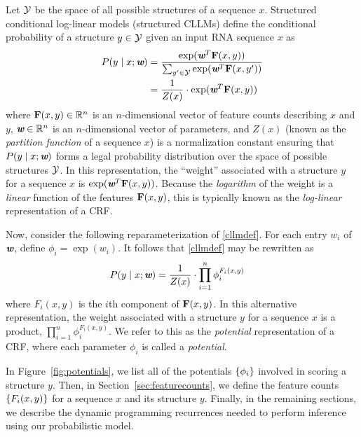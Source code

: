 \documentclass{article}
\begin{document}
  Let ${\mathcal{Y}}$ be the space of all possible structures of a sequence $x$.  
  Structured conditional log-linear models (structured CLLMs) define the 
  conditional probability of a structure $y \in {\mathcal{Y}}$ given an input RNA sequence $x$ as
  \begin{align}
    P(y \mid x; {\textbf{\em w}}) &= \frac{\exp ({\textbf{\em w}}^T {\mathbf{F}}(x,y))}{\sum_{y' \in {\mathcal{Y}}} \exp ({\textbf{\em w}}^T {\mathbf{F}}(x,y'))} \\
    &= \frac{1}{Z(x)} \cdot \exp ({\textbf{\em w}}^T {\mathbf{F}}(x,y)) \label{cllmdef}
  \end{align}
  where ${\mathbf{F}}(x,y) \in {\mathbb{R}}^n$ is an $n$-dimensional vector of feature counts describing $x$ and $y$, 
  ${\textbf{\em w}} \in {\mathbb{R}}^n$ is an $n$-dimensional vector
  of parameters, and $Z(x)$ (known as the \emph{partition function} of a sequence $x$) is a normalization
  constant ensuring that $P(y \mid x; {\textbf{\em w}})$ forms a legal probability distribution over the
  space of possible structures ${\mathcal{Y}}$.  In this representation, the ``weight'' associated with a structure
  $y$ for a sequence $x$ is $\exp({\textbf{\em w}}^T{\mathbf{F}}(x,y))$.  Because the \emph{logarithm} of the weight is
  a \emph{linear} function of the features ${\mathbf{F}}(x,y)$, this is typically known as the
  \emph{log-linear} representation of a CRF.

  Now, consider the following reparameterization of \eqref{cllmdef}.  For each entry $w_i$ of ${\textbf{\em w}}$,
  define $\phi_i = \exp(w_i)$.  It follows that \eqref{cllmdef} may be rewritten as
  \begin{align}
    P(y \mid x; {\textbf{\em w}}) &= \frac{1}{Z(x)} \cdot \prod_{i=1}^n \phi_i^{F_i(x,y)}
  \end{align}
  where $F_i(x,y)$ is the $i$th component of ${\mathbf{F}}(x,y)$.  In this alternative representation, the
  weight associated with a structure $y$ for a sequence $x$ is a product, $\prod_{i=1}^n \phi_i^{F_i(x,y)}$.  
  We refer to this as the \emph{potential} representation of a CRF, where each parameter $\phi_i$ is called
  a \emph{potential}.  
  
  In Figure~\ref{fig:potentials},
  we list all of the potentials ${\left\{{\phi_i}\right\}}$ involved in scoring a structure $y$.  Then, in Section~\ref{sec:featurecounts}, we
  define the feature counts ${\left\{{F_i(x,y)}\right\}}$ for a sequence $x$ and its structure $y$.  Finally, in the remaining sections,
  we describe the dynamic programming recurrences needed to perform inference using our probabilistic model.
\end{document}
